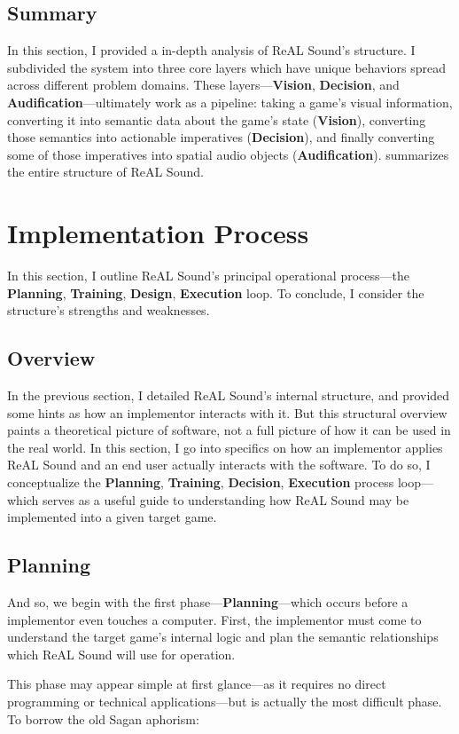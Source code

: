 \documentclass{report}
\newcommand{\rs}{ReAL Sound\xspace}
\newcommand{\plan}{\textbf{Planning}\xspace}
\newcommand{\train}{\textbf{Training}\xspace}
\newcommand{\design}{\textbf{Design}\xspace}
\newcommand{\exec}{\textbf{Execution}\xspace}
\newcommand{\vision}{\textbf{Vision}\xspace}
\newcommand{\decision}{\textbf{Decision}\xspace}
\newcommand{\audio}{\textbf{Audification}\xspace}
\newcommand{\imp}{implementor\xspace}
\begin{document}
\subsection{Summary}

In this section, I provided a in-depth analysis of \rs's structure. I subdivided the system into three core layers which have unique behaviors spread across different problem domains. These layers---\vision, \decision, and \audio---ultimately work as a pipeline: taking a game's visual information, converting it into semantic data about the game's state (\vision), converting those semantics into actionable imperatives (\decision), and finally converting some of those imperatives into spatial audio objects (\audio).  summarizes the entire structure of \rs.


\section{Implementation Process}
In this section, I outline \rs's principal operational process---the \plan, \train, \design, \exec loop. To conclude, I consider the structure's strengths and weaknesses.        

\subsection{Overview}
In the previous section, I detailed \rs's internal structure, and provided some hints as how an implementor interacts with it. But this structural overview paints a theoretical picture of software, not a full picture of how it can be used in the real world. In this section, I go into specifics on how an implementor applies \rs and an end user actually interacts with the software. To do so, I conceptualize the \plan, \train, \decision, \exec process loop---which serves as a useful guide to understanding how \rs may be implemented into a given target game. 

\subsection{Planning}

And so, we begin with the first phase---\plan---which occurs before a implementor even touches a computer. First, the \imp must come to understand the target game's internal logic and plan the semantic relationships which \rs will use for operation.

This phase may appear simple at first glance---as it requires no direct programming or technical applications---but is actually the most difficult phase. To borrow the old Sagan aphorism:
\end{document}
